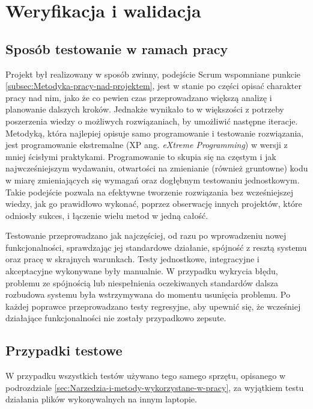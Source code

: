 \documentclass[a4paper,twoside,12pt]{book}
\newcommand{\obcy}[1]{\emph{#1}}
\newcommand{\english}[1]{{\selectlanguage{british}\obcy{#1}}}
\begin{document}
%
%
%
\chapter{Weryfikacja i walidacja}
\label{ch:Weryfikacja-i-walidacja}

\section{Sposób testowanie w ramach pracy}
\label{sec:Sposob-testowanie-w-ramach-pracy}

Projekt był realizowany w sposób zwinny, podejście Scrum wspomniane punkcie \ref{subsec:Metodyka-pracy-nad-projektem}, jest w stanie po części opisać charakter pracy nad nim, jako że co pewien czas przeprowadzano większą analizę i planowanie dalszych kroków. Jednakże wynikało to w większości z potrzeby poszerzenia wiedzy o możliwych rozwiązaniach, by umożliwić następne iteracje. Metodyką, która najlepiej opisuje samo programowanie i testowanie rozwiązania, jest programowanie ekstremalne (XP ang. \english{eXtreme Programming}) w wersji z mniej ścisłymi praktykami. Programowanie to skupia się na częstym i jak najwcześniejszym wydawaniu, otwartości na zmienianie (również gruntowne) kodu w miarę zmieniających się wymagań oraz dogłębnym testowaniu jednostkowym. Takie podejście pozwala na efektywne tworzenie rozwiązania bez wcześniejszej wiedzy, jak go prawidłowo wykonać, poprzez obserwację innych projektów, które odniosły sukces, i łączenie wielu metod w jedną całość.

Testowanie przeprowadzano jak najczęściej, od razu po wprowadzeniu nowej funkcjonalności, sprawdzając jej standardowe działanie, spójność z resztą systemu oraz pracę w skrajnych warunkach. Testy jednostkowe, integracyjne i akceptacyjne wykonywane były manualnie. W przypadku wykrycia błędu, problemu ze spójnością lub niespełnienia oczekiwanych standardów dalsza rozbudowa systemu była wstrzymywana do momentu usunięcia problemu. Po każdej poprawce przeprowadzano testy regresyjne, aby upewnić się, że wcześniej działające funkcjonalności nie zostały przypadkowo zepsute.

\section{Przypadki testowe}
\label{sec:Przypadki-testowe}

W przypadku wszystkich testów używano tego samego sprzętu, opisanego w podrozdziale \ref{sec:Narzedzia-i-metody-wykorzystane-w-pracy}, za wyjątkiem testu działania plików wykonywalnych na innym laptopie. 
\end{document}
